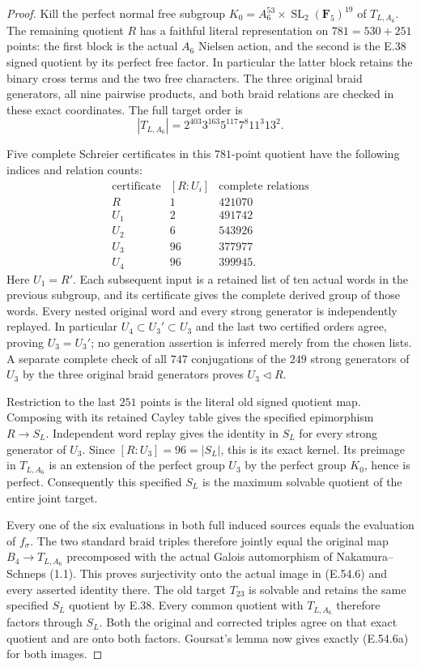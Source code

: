 \begin{proof}
Kill the perfect normal free subgroup
$K_0=A_6^{53}\times\operatorname{SL}_2(\mathbf F_5)^{19}$
of $T_{L,A_6}$.  The remaining quotient $R$ has a faithful
literal representation on $781=530+251$ points: the first
block is the actual $A_6$ Nielsen action, and the second
is the E.38 signed quotient by its perfect free factor.
In particular the latter block retains the binary cross
terms and the two free characters.  The three original
braid generators, all nine pairwise products, and both
braid relations are checked in these exact coordinates.
The full target order is
\[
              |T_{L,A_6}|=2^{403}3^{163}5^{117}7^8 11^3 13^2.
 \tag{E.54.23}
\]

Five complete Schreier certificates in this $781$-point
quotient have the following indices and relation counts:
\[
 \begin{array}{c|r|r}
 \text{certificate}&[R:U_i]&\text{complete relations}\\\hline
 R&1&421070\\
 U_1&2&491742\\
 U_2&6&543926\\
 U_3&96&377977\\
 U_4&96&399945.
 \end{array}
 \tag{E.54.24}
\]
Here $U_1=R'$.  Each subsequent input is a retained list
of ten actual words in the previous subgroup, and its
certificate gives the complete derived group of those
words.  Every nested original word and every strong
generator is independently replayed.  In particular
$U_4\subset U_3'\subset U_3$ and the last two certified
orders agree, proving $U_3=U_3'$; no generation assertion
is inferred merely from the chosen lists.  A separate
complete check of all $747$ conjugations of the $249$
strong generators of $U_3$ by the three original braid
generators proves $U_3\triangleleft R$.

Restriction to the last $251$ points is the literal old
signed quotient map.  Composing with its retained Cayley
table gives the specified epimorphism $R\to S_L$.
Independent word replay gives the identity in $S_L$ for
every strong generator of $U_3$.  Since $[R:U_3]=96=|S_L|$,
this is its exact kernel.  Its preimage in $T_{L,A_6}$ is
an extension of the perfect group $U_3$ by the perfect
group $K_0$, hence is perfect.  Consequently this
specified $S_L$ is the maximum solvable quotient of the
entire joint target.

Every one of the six evaluations in both full induced
sources equals the evaluation of $f_\sigma$.  The two
standard braid triples therefore jointly equal the
original map $B_4\to T_{L,A_6}$ precomposed with the
actual Galois automorphism of Nakamura--Schneps (1.1).
This proves surjectivity onto the actual image in
\textup{(E.54.6)} and every asserted identity there.
The old target $T_{23}$ is solvable and retains the same
specified $S_L$ quotient by E.38.  Every common quotient
with $T_{L,A_6}$ therefore factors through $S_L$.
Both the original and corrected triples agree on that
exact quotient and are onto both factors.  Goursat's
lemma now gives exactly \textup{(E.54.6a)} for both
images.


\end{proof}
